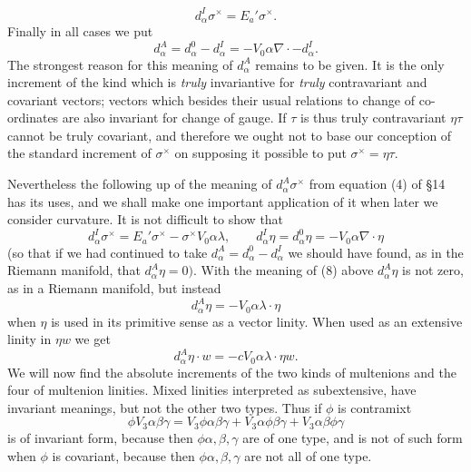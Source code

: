 \documentclass[11pt]{article}
\begin{document}
\begin{equation}d_{\alpha}^{I}\sigma^\times=E_a'\sigma^\times.\tag{7}\end{equation}
Finally in all cases we put
\begin{equation}d_{\alpha}^{A}=d_{\alpha}^{0}-d_{\alpha}^{I}=-V_0\alpha\nabla\cdot-d_{\alpha}^{I}.\tag{8}\end{equation}
The strongest reason for this meaning of $d_{\alpha}^{A}$ remains to be given. It is the only increment of the kind which is \emph{truly} invariantive for \emph{truly} contravariant and covariant vectors; vectors which besides their usual relations to change of co-ordinates are also invariant for change of gauge. If $\tau$ is thus truly contravariant $\eta\tau$ cannot be truly covariant, and therefore we ought not to base our conception of the standard increment of $\sigma^\times$ on supposing it possible to put $\sigma^\times=\eta\tau$.

\indent Nevertheless the following up of the meaning of $d_{\alpha}^{A}\sigma^\times$ from equation (4)
of §14 has its uses, and we shall make one important application of it when later we consider curvature. It is not difficult to show that
\begin{equation}d_{\alpha}^{I}\sigma^\times=E_a'\sigma^\times-\sigma^\times V_0\alpha\lambda,\qquad d_{\alpha}^{I}\eta=d_{\alpha}^{0}\eta=-V_0\alpha\nabla\cdot\eta\tag{9}\end{equation}
(so that if we had continued to take $d_{\alpha}^{A}=d_{\alpha}^{0}-d_{\alpha}^{I}$ we should have found, as in the Riemann manifold, that $d_{\alpha}^{A}\eta=0).$ With the meaning of (8) above $d_{\alpha}^{A}\eta$ is not zero, as in a Riemann manifold, but instead
\[
d_{\alpha}^{A}\eta=-V_0\alpha\lambda\cdot\eta
\]
when $\eta$ is used in its primitive sense as a vector linity. When used as an extensive linity in $\eta w$ we get
\begin{equation}d_{\alpha}^{A}\eta\cdot w=-cV_0\alpha\lambda\cdot\eta w.\tag{10}\end{equation}
We will now find the absolute increments of the two kinds of multenions and the four of multenion linities. Mixed linities interpreted as subextensive, have invariant meanings, but not the other two types. Thus if $\phi$ is contramixt
\[
\phi V_3\alpha\beta\gamma=V_3\phi\alpha\beta\gamma+V_3\alpha\phi\beta\gamma+V_3\alpha\beta\phi\gamma
\]
is of invariant form, because then $\phi\alpha,\beta,\gamma$ are of one type, and is not of such form when $\phi$ is covariant, because then $\phi\alpha,\beta,\gamma$ are not all of one type.
\end{document}
